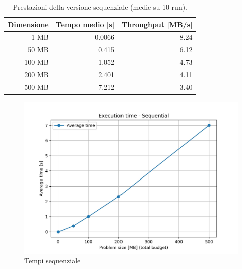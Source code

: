 			\begin{table}[H]
				\centering
				\begin{tabular}{|r|r|r|}
					\hline
					\textbf{Dimensione} & \textbf{Tempo medio [s]} & \textbf{Throughput [MB/s]} \\
					\hline
					1 MB                     & 0.0066                   & 8.24                       \\
					50 MB                    & 0.415                    & 6.12                       \\
					100 MB                   & 1.052                    & 4.73                       \\
					200 MB                   & 2.401                    & 4.11                       \\
					500 MB                   & 7.212                    & 3.40                       \\
					\hline
				\end{tabular}
				\caption{Prestazioni della versione sequenziale (medie su 10 run).}
				\label{tab:seq-avg-throughput}
			\end{table}
			
			\begin{figure}[H]
				\centering
				\includegraphics[width=1\linewidth]{img/seq_plots/seq_time.jpg}
				\caption{Tempi sequenziale}
				\label{fig:seq_time}
			\end{figure}
			
